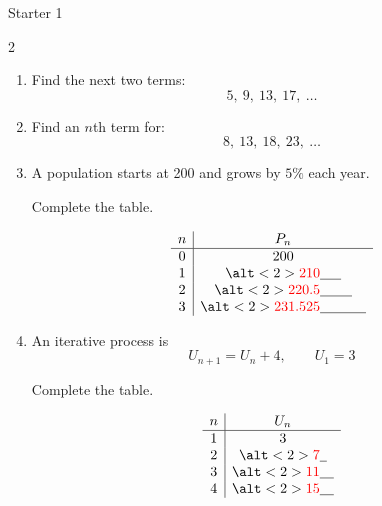 \documentclass{beamer}
\newcommand{\ablank}[1]{%
  \alt<2>{\textcolor{red}{#1}}{\underline{\phantom{#1}}}%
}
\newcommand{\ashow}[1]{\uncover<2->{\textcolor{red}{\small #1}}}
\begin{document}
\begin{frame}{Starter 1}
\hypertarget{q-st1}{}

\small

\begin{multicols}{2}

\begin{enumerate}

\item Find the next two terms:
\[
5,\ 9,\ 13,\ 17,\ \dots
\]

\ashow{$21,\ 25$}

\vspace{0.4cm}

\item Find an $n$th term for:
\[
8,\ 13,\ 18,\ 23,\ \dots
\]

\ashow{$5n+3$}

\vspace{0.4cm}

\item A population starts at 200 and grows by $5\%$ each year.

Complete the table.

\[
\begin{array}{c|c}
n & P_n \\
\hline
0 & 200 \\
1 & \ablank{210} \\
2 & \ablank{220.5} \\
3 & \ablank{231.525}
\end{array}
\]

\vspace{0.2cm}


\vspace{0.4cm}

\item An iterative process is
\[
U_{n+1} = U_n + 4, \qquad U_1 = 3
\]

Complete the table.

\[
\begin{array}{c|c}
n & U_n \\
\hline
1 & 3 \\
2 & \ablank{7} \\
3 & \ablank{11} \\
4 & \ablank{15}
\end{array}
\]

\end{enumerate}

\end{multicols}

\end{frame}
\end{document}
